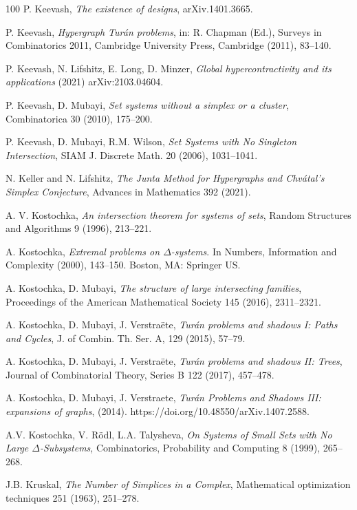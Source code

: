 \documentclass[graybox]{svmult}
\begin{document}
\begin{thebibliography}{100}
 P. Keevash, {\it The existence of designs}, arXiv.1401.3665.

 P. Keevash, {\it Hypergraph Tur\'an problems}, in: R. Chapman (Ed.), Surveys in Combinatorics 2011, Cambridge University Press, Cambridge (2011), 83–140.


 P. Keevash, N. Lifshitz, E. Long, D. Minzer, {\it Global hypercontractivity and its applications} (2021) arXiv:2103.04604.

 P. Keevash, D. Mubayi, {\it Set systems without a simplex or a cluster}, Combinatorica 30 (2010), 175--200.


 P. Keevash, D. Mubayi, R.M. Wilson, {\it Set Systems with No Singleton Intersection}, SIAM J. Discrete Math. 20 (2006), 1031--1041.

 N. Keller and N. Lifshitz, {\it The Junta Method for Hypergraphs and Chv\'atal's Simplex Conjecture}, Advances in Mathematics 392 (2021).

 A. V. Kostochka, {\it An intersection theorem for systems of sets}, Random Structures and Algorithms 9 (1996), 213--221.

 A. Kostochka, {\it Extremal problems on $\Delta$-systems}. In Numbers, Information and Complexity (2000), 143--150. Boston, MA: Springer US.

 A. Kostochka, D. Mubayi, {\it The structure of large intersecting families}, Proceedings of the American Mathematical Society 145 (2016), 2311--2321.

 A. Kostochka, D. Mubayi, J. Verstra\"ete, {\it Tur\'an problems and shadows I: Paths and Cycles}, J. of Combin. Th. Ser. A, 129 (2015), 57--79.

 A. Kostochka, D. Mubayi, J. Verstra\"ete, {\it Tur\'an problems and shadows II: Trees}, Journal of Combinatorial Theory, Series B 122 (2017), 457--478.


 A. Kostochka, D. Mubayi, J. Verstraete, {\it Tur\'an Problems and Shadows III: expansions of graphs}, (2014). https://doi.org/10.48550/arXiv.1407.2588.

 A.V. Kostochka, V. R\"odl, L.A. Talysheva, {\it On Systems of Small Sets with No Large $\Delta$-Subsystems}, Combinatorics, Probability and Computing 8 (1999), 265--268.

 J.B. Kruskal, {\it The Number of Simplices in a Complex}, Mathematical optimization techniques
251 (1963), 251--278.


\end{thebibliography}
\end{document}
